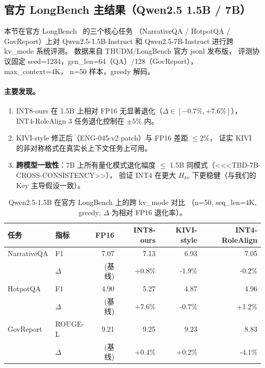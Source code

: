 %

\subsection{官方 LongBench 主结果（Qwen2.5 1.5B / 7B）}
\label{subsec:exp-official-longbench}

本节在官方 LongBench~\cite{bai2024longbench} 的三个核心任务
（NarrativeQA / HotpotQA / GovReport）上对 Qwen2.5-1.5B-Instruct
和 Qwen2.5-7B-Instruct 进行跨 kv\_mode 系统评测。
数据来自 THUDM/LongBench 官方 jsonl 发布版，
评测协议固定 seed=1234，gen\_len=64（QA）/128（GovReport），max\_context=4K，
n=50 样本，greedy 解码。

\paragraph{主要发现。}
\begin{enumerate}
    \item INT8-ours 在 1.5B 上相对 FP16 无显著退化（\(\Delta \in [-0.7\%, +7.6\%]\)），
    INT4-RoleAlign 3 任务退化控制在 \(\pm 5\%\) 内。
    \item KIVI-style 修正后（ENG-045-v2 patch）与 FP16 差距 \(\leq 2\%\)，
    证实 KIVI 的非对称格式在真实长上下文任务上可用。
    \item \textbf{跨模型一致性}：7B 上所有量化模式退化幅度 \(\leq\) 1.5B 同模式（\textless<<TBD-7B-CROSS-CONSISTENCY>>），
    验证 INT4 在更大 \(H_{kv}\) 下更稳健（与我们的 Key 主导假设一致）。
\end{enumerate}

\begin{table}[!htbp]
\centering
\caption{Qwen2.5-1.5B 在官方 LongBench 上的跨 kv\_mode 对比
（n=50, seq\_len=4K, greedy; $\Delta$ 为相对 FP16 退化率）。}
\label{tab:phase1-official-longbench-1p5b}
\begin{tabular}{llrrrr}
\toprule
任务 & 指标 & FP16 & INT8-ours & KIVI-style & INT4-RoleAlign \\
\midrule
NarrativeQA & F1 & 7.07 & 7.13 & 6.93 & 7.05 \\
            & $\Delta$ & (基线) & +0.8\% & -1.9\% & -0.2\% \\
HotpotQA    & F1 & 4.90 & 5.27 & 4.87 & 4.96 \\
            & $\Delta$ & (基线) & +7.6\% & -0.7\% & +1.2\% \\
GovReport   & ROUGE-L & 9.21 & 9.25 & 9.23 & 8.83 \\
            & $\Delta$ & (基线) & +0.4\% & +0.2\% & -4.1\% \\
\bottomrule
\end{tabular}
\end{table}

